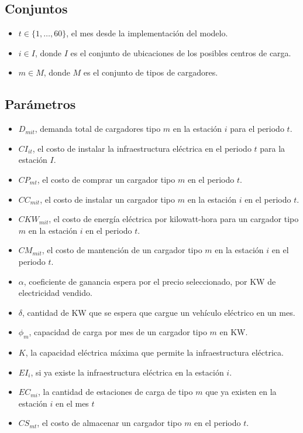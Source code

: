 \documentclass[letterpaper]{article}
\begin{document}
\begin{flushleft}
	\subsection{Conjuntos}
	\begin{itemize}
		\item $t \in \{1, \ldots, 60\}$, el mes desde la implementación del modelo.
		\item $i \in I$, donde $I$ es el conjunto de ubicaciones de los posibles centros de carga.
		\item $m \in M$, donde $M$ es el conjunto de tipos de cargadores.
	\end{itemize}

	\subsection{Parámetros}
	\begin{itemize}
		\item $D_{mit}$, demanda total de cargadores tipo $m$ en la estación $i$ para el periodo $t$.
		\item $CI_{it}$, el costo de instalar la infraestructura el\'ectrica en el periodo $t$ para la estaci\'on $I$.
		\item $CP_{mt}$, el costo de comprar un cargador tipo $m$ en el periodo $t$.
		\item $CC_{mit}$, el costo de instalar un cargador tipo $m$ en la estación $i$ en el periodo $t$.
		\item $CKW_{mit}$, el costo de energía eléctrica por kilowatt-hora para un cargador tipo $m$ en la estación $i$ en el periodo $t$.
		\item $CM_{mit}$, el costo de mantención de un cargador tipo $m$ en la estación $i$ en el periodo $t$.
		\item $\alpha$, coeficiente de ganancia espera por el precio seleccionado, por KW de electricidad vendido.
		\item $\delta$, cantidad de KW que se espera que cargue un vehículo eléctrico en un mes.
		\item $\phi_m$, capacidad de carga por mes de un cargador tipo $m$ en KW.
		\item $K$, la capacidad eléctrica máxima que permite la infraestructura eléctrica.
		\item $EI_{i}$, si ya existe la infraestructura eléctrica en la estación $i$.
		\item $EC_{mi}$, la cantidad de estaciones de carga de tipo $m$ que ya existen en la estación $i$ en el mes $t$
		\item $CS_{mt}$, el costo de almacenar un cargador tipo $m$ en el periodo $t$.
	\end{itemize}

\end{flushleft}
\end{document}
